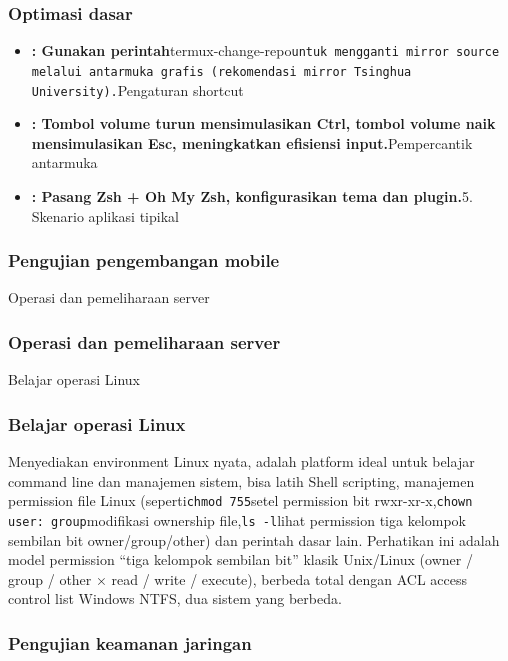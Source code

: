 \subsubsection*{Optimasi dasar}

\begin{itemize}
  \item \textbf{: Gunakan perintah}termux-change-repo\texttt{untuk mengganti mirror source melalui antarmuka grafis (rekomendasi mirror Tsinghua University).\allowbreak }Pengaturan shortcut
  \item \textbf{: Tombol volume turun mensimulasikan Ctrl, tombol volume naik mensimulasikan Esc, meningkatkan efisiensi input.}Pempercantik antarmuka
  \item \textbf{: Pasang Zsh + Oh My Zsh, konfigurasikan tema dan plugin.}5. Skenario aplikasi tipikal
\end{itemize}


\subsubsection*{Pengujian pengembangan mobile}

Operasi dan pemeliharaan server

\subsubsection*{Operasi dan pemeliharaan server}

Belajar operasi Linux

\subsubsection*{Belajar operasi Linux}

Menyediakan environment Linux nyata, adalah platform ideal untuk belajar command line dan manajemen sistem, bisa latih Shell scripting, manajemen permission file Linux (seperti\texttt{chmod 755}setel permission bit rwxr-xr-x,\texttt{chown user: group}modifikasi ownership file,\texttt{ls -\allowbreak l}lihat permission tiga kelompok sembilan bit owner/group/other) dan perintah dasar lain. Perhatikan ini adalah model permission “tiga kelompok sembilan bit” klasik Unix/Linux (owner / group / other × read / write / execute), berbeda total dengan ACL access control list Windows NTFS, dua sistem yang berbeda.

\subsubsection*{Pengujian keamanan jaringan}

